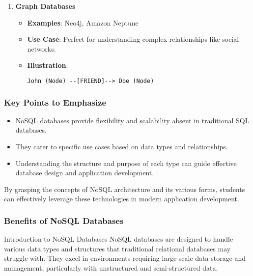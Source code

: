 \documentclass[aspectratio=169]{beamer}
\begin{document}
\begin{frame}[fragile]
\begin{enumerate}
        \item \textbf{Graph Databases}
            \begin{itemize}
                \item \textbf{Examples}: Neo4j, Amazon Neptune
                \item \textbf{Use Case}: Perfect for understanding complex relationships like social networks.
                \item \textbf{Illustration}:
                \begin{lstlisting}[basicstyle=\small]
                John (Node) --[FRIEND]--> Doe (Node)
                \end{lstlisting}
            \end{itemize}
    \end{enumerate}
\end{frame}

\begin{frame}[fragile]
    \frametitle{Key Points to Emphasize}
    \begin{itemize}
        \item NoSQL databases provide flexibility and scalability absent in traditional SQL databases.
        \item They cater to specific use cases based on data types and relationships.
        \item Understanding the structure and purpose of each type can guide effective database design and application development.
    \end{itemize}
    
    By grasping the concepts of NoSQL architecture and its various forms, students can effectively leverage these technologies in modern application development.
\end{frame}

\begin{frame}[fragile]
    \frametitle{Benefits of NoSQL Databases}
    \begin{block}{Introduction to NoSQL Databases}
        NoSQL databases are designed to handle various data types and structures that traditional relational databases may struggle with. They excel in environments requiring large-scale data storage and management, particularly with unstructured and semi-structured data.
    \end{block}
\end{frame}
\end{document}
